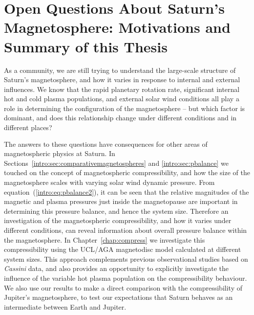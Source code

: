 \section[Open Questions About Saturn's Magnetosphere]{Open Questions About Saturn's Magnetosphere: Motivations and Summary of this Thesis}
As a community, we are still trying to understand the large-scale structure of Saturn's magnetosphere, and how it varies in response to internal and external influences. We know that the rapid planetary rotation rate, significant internal hot and cold plasma populations, and external solar wind conditions all play a role in determining the configuration of the magnetosphere – but which factor is dominant, and does this relationship change under different conditions and in different places?

The answers to these questions have consequences for other areas of magnetospheric physics at Saturn. In Sections~\ref{intro:sec:comparativemagnetospheres} and \ref{intro:sec:pbalance} we touched on the concept of magnetospheric compressibility, and how the size of the magnetosphere scales with varying solar wind dynamic pressure. From equation~(\ref{intro:eq:pbalance2}), it can be seen that the relative magnitudes of the magnetic and plasma pressures just inside the magnetopause are important in determining this pressure balance, and hence the system size. Therefore an investigation of the magnetospheric compressibility, and how it varies under different conditions, can reveal information about overall pressure balance within the magnetosphere. In Chapter~\ref{chap:compress} we investigate this compressibility using the UCL/AGA magnetodisc model calculated at different system sizes. This approach complements previous observational studies based on \textit{Cassini} data, and also provides an opportunity to explicitly investigate the influence of the variable hot plasma population on the compressibility behaviour. We also use our results to make a direct comparison with the compressibility of Jupiter's magnetosphere, to test our expectations that Saturn behaves as an intermediate between Earth and Jupiter.

